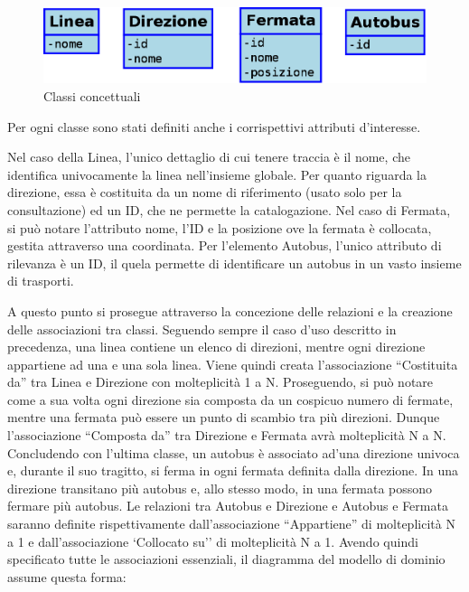 \vspace{1cm}
\begin{figure}[htbp]
\begin{center}
\includegraphics[width=12cm]{contents/images/classi_concettuali}
\end{center}
\caption{Classi concettuali}
\label{fig:classes}
\end{figure}

\newpage
Per ogni classe sono stati definiti anche i corrispettivi attributi d'interesse.

Nel caso della Linea, l'unico dettaglio di cui tenere traccia è il nome, che identifica univocamente la linea nell'insieme globale. Per quanto riguarda la direzione, essa è costituita da un nome di riferimento (usato solo per la consultazione) ed un ID, che ne permette la catalogazione.
Nel caso di Fermata, si può notare l'attributo nome, l'ID e la posizione ove la fermata è collocata, gestita attraverso una coordinata.
Per l'elemento Autobus, l'unico attributo di rilevanza è un ID, il quela permette di identificare un autobus in un vasto insieme di trasporti.

A questo punto si prosegue attraverso la concezione delle relazioni e la creazione delle associazioni tra classi.
Seguendo sempre il caso d'uso descritto in precedenza, una linea contiene un elenco di direzioni, mentre ogni direzione appartiene ad una e una sola linea. Viene quindi creata l'associazione ``Costituita da'' tra Linea e Direzione con molteplicità 1 a N.
Proseguendo, si può notare come a sua volta ogni direzione sia composta da un cospicuo numero di fermate, mentre una fermata può essere un punto di scambio tra più direzioni. Dunque l'associazione ``Composta da'' tra Direzione e Fermata avrà molteplicità N a N.
Concludendo con l'ultima classe, un autobus è associato ad'una direzione univoca e, durante il suo tragitto, si ferma in ogni fermata definita dalla direzione. In una direzione transitano più autobus e, allo stesso modo, in una fermata possono fermare più autobus. Le relazioni tra Autobus e Direzione e Autobus e Fermata saranno definite rispettivamente dall'associazione ``Appartiene'' di molteplicità N a 1 e dall'associazione `Collocato su'' di molteplicità N a 1.
\newpage
Avendo quindi specificato tutte le associazioni essenziali, il diagramma del modello di dominio assume questa forma:

